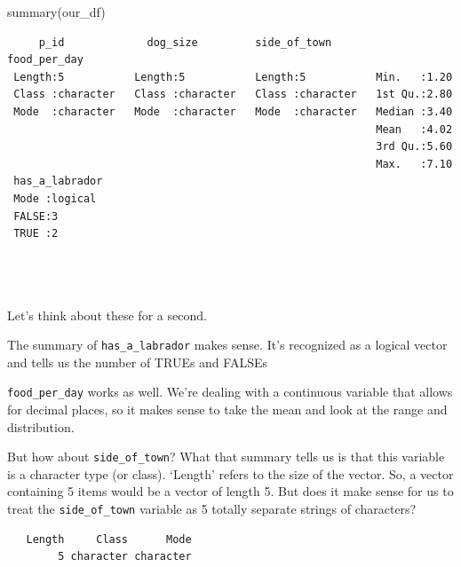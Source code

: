 \documentclass[
  letterpaper,
  DIV=11,
  numbers=noendperiod]{scrreprt}
\newenvironment{Shaded}{\begin{snugshade}}{\end{snugshade}}
\newcommand{\FunctionTok}[1]{\textcolor[rgb]{0.28,0.35,0.67}{#1}}
\newcommand{\NormalTok}[1]{\textcolor[rgb]{0.00,0.23,0.31}{#1}}
\newcommand{\SpecialCharTok}[1]{\textcolor[rgb]{0.37,0.37,0.37}{#1}}
\begin{document}
\begin{Shaded}
\begin{Highlighting}[]
\FunctionTok{summary}\NormalTok{(our\_df)}
\end{Highlighting}
\end{Shaded}

\begin{verbatim}
     p_id             dog_size         side_of_town        food_per_day 
 Length:5           Length:5           Length:5           Min.   :1.20  
 Class :character   Class :character   Class :character   1st Qu.:2.80  
 Mode  :character   Mode  :character   Mode  :character   Median :3.40  
                                                          Mean   :4.02  
                                                          3rd Qu.:5.60  
                                                          Max.   :7.10  
 has_a_labrador 
 Mode :logical  
 FALSE:3        
 TRUE :2        
                
                
                
\end{verbatim}

Let's think about these for a second.

The summary of \texttt{has\_a\_labrador} makes sense. It's recognized as
a logical vector and tells us the number of TRUEs and FALSEs

\texttt{food\_per\_day} works as well. We're dealing with a continuous
variable that allows for decimal places, so it makes sense to take the
mean and look at the range and distribution.

But how about \texttt{side\_of\_town}? What that summary tells us is
that this variable is a character type (or class). `Length' refers to
the size of the vector. So, a vector containing 5 items would be a
vector of length 5. But does it make sense for us to treat the
\texttt{side\_of\_town} variable as 5 totally separate strings of
characters?

\begin{Shaded}
\end{Shaded}

\begin{verbatim}
   Length     Class      Mode 
        5 character character 
\end{verbatim}
\end{document}
